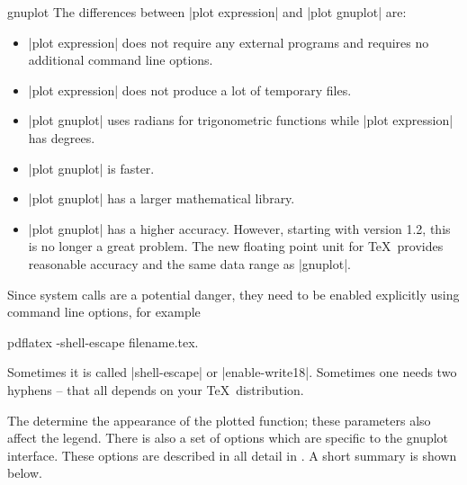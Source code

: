 {\begin{addplotoperation}[]{gnuplot}{}
The differences between |plot expression| and |plot gnuplot| are:
\begin{itemize}
	\item |plot expression| does not require any external programs and requires no additional command line options.
	\item |plot expression| does not produce a lot of temporary files.
	\item |plot gnuplot| uses radians for trigonometric functions while |plot expression| has degrees.
	\item |plot gnuplot| is faster.
	\item |plot gnuplot| has a larger mathematical library.
	\item |plot gnuplot| has a higher accuracy. However, starting with version 1.2, this is no longer a great problem. The new floating point unit for \TeX\ provides reasonable accuracy and the same data range as |gnuplot|.
\end{itemize}

Since system calls are a potential danger, they need to be enabled explicitly using command line options, for example
\begin{codeexample}
pdflatex -shell-escape filename.tex.
\end{codeexample}
Sometimes it is called |shell-escape| or |enable-write18|. Sometimes one needs two hyphens -- that all depends on your \TeX\ distribution.
\begin{codeexample}[]
\end{codeexample}

\begin{codeexample}[]
\end{codeexample}

The  determine the appearance of the plotted function; these parameters also affect the legend. There is also a set of options which are specific to the gnuplot interface. These options are described in all detail in \cite[section~18.6]{tikz}. A short summary is shown below.



\end{addplotoperation}}
